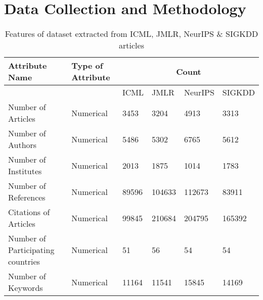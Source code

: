 \section{Data Collection and Methodology}
\label{sec:methodology}

\begin{table*}[!h]
	\centering
	\scriptsize
	\caption{Features of dataset extracted from ICML, JMLR, NeurIPS \& SIGKDD articles }
	\label{tab:table1}
	\begin{adjustbox}{width=1\textwidth}
		\begin{tabular}{llllll} 
\hline
\textbf{Attribute Name}           & \textbf{Type of Attribute}  & \multicolumn{4}{c}{\textbf{Count}}  \\ 
\hline
                                  &                             & ICML   & JMLR  & NeurIPS & SIGKDD      \\ 
\hline
Number of Articles                & Numerical                   & 3453    & 3204  & 4913       & 3313        \\
Number of Authors                 & Numerical                   & 5486   & 5302  & 6765       & 5612        \\
Number of Institutes              & Numerical                   & 2013    & 1875   & 1014       & 1783        \\
Number of References              & Numerical                   & 89596 & 104633 & 112673       & 83911        \\
Citations of Articles             & Numerical                   & 99845  & 210684 & 204795       & 165392        \\
Number of Participating countries & Numerical                   & 51   & 56  & 54       & 54        \\
Number of Keywords                & Numerical                   & 11164      & 11541     & 15845       & 14169        \\
\hline
\end{tabular}
	\end{adjustbox}
\end{table*}
